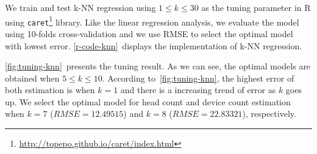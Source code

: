 	We train and test \ac{k-NN} regression using $1 \le k \le 30$ as the tuning parameter in R using \verb|caret|\footnote{\url{http://topepo.github.io/caret/index.html}} library. Like the linear regression analysis, we evaluate the model using 10-folds cross-validation and we use \ac{RMSE} to select the optimal model with lowest error. \autoref{r-code-knn}~displays the implementation of \ac{k-NN} regression.

	\autoref{fig:tuning-knn}~presents the tuning result. As we can see, the optimal models are obtained when $5 \le k \le 10$. According to~\autoref{fig:tuning-knn}, the highest error of both estimation is when $k=1$ and there is a increasing trend of error as $k$ goes up. We select the optimal model for head count and device count estimation when $k=7$ ($RMSE=12.49515$) and $k=8$ ($RMSE=22.83321$), respectively.









